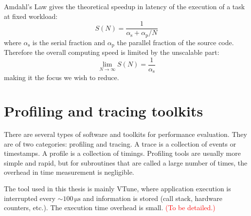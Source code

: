 Amdahl's Law gives the theoretical speedup in latency of the execution
of a task at fixed workload:
\begin{equation}
S(N)=\dfrac{1}{\alpha_{\mathrm{s}}+\alpha_{\mathrm{p}}/N}
\end{equation}
where $\alpha_{\mathrm{s}}$ is the serial fraction and $\alpha_{\mathrm{p}}$
the parallel fraction of the source code. Therefore the overall computing
speed is limited by the unscalable part:
\begin{equation}
\lim_{N\rightarrow\infty}S(N)=\frac{1}{\alpha_{\mathrm{s}}}
\end{equation}
making it the focus we wish to reduce.


\section{Profiling and tracing toolkits}

There are several types of software and toolkits for performance evaluation.
They are of two categories: profiling and tracing. A trace is a collection
of events or timestamps. A profile is a collection of timings. Profiling
tools are usually more simple and rapid, but for subroutines that are called
a large number of times, the overhead in time measurement is negligible. 

The tool used in this thesis is mainly VTune, where application execution
is interrupted every $\sim100\,\mathrm{\mu s}$ and information is
stored (call stack, hardware counters, etc.). The execution time overhead
is small. \textcolor{red}{(To be detailed.)}
